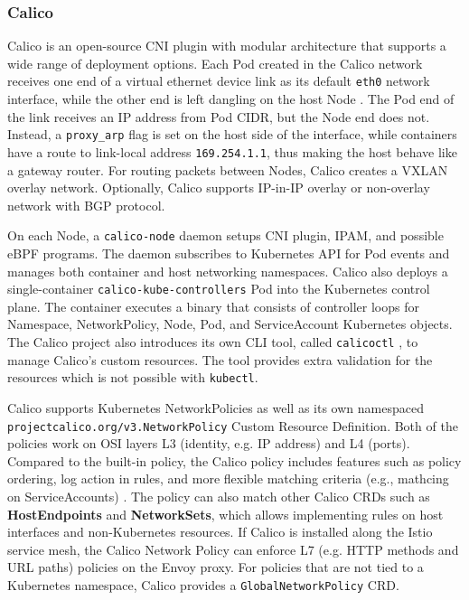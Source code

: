\documentclass[english, 12pt, a4paper, sci, utf8, a-2b, online]{aaltothesis}
\begin{document}
\subsubsection{Calico}

Calico \cite{calico} is an open-source CNI plugin with modular architecture that supports a wide range of deployment options. Each Pod created in the Calico network receives one end of a virtual ethernet device link as its default \texttt{eth0} network interface, while the other end is left dangling on the host Node \cite{calico-tkng}. The Pod end of the link receives an IP address from Pod CIDR, but the Node end does not. Instead, a \texttt{proxy\_arp} flag is set on the host side of the interface, while containers have a route to link-local address \texttt{169.254.1.1}, thus making the host behave like a gateway router. For routing packets between Nodes, Calico creates a VXLAN overlay network. Optionally, Calico supports IP-in-IP overlay or non-overlay network with BGP protocol.

On each Node, a \texttt{calico-node} daemon setups CNI plugin, IPAM, and possible eBPF programs. The daemon subscribes to Kubernetes API for Pod events and manages both container and host networking namespaces. Calico also deploys a single-container \texttt{calico-kube-controllers} Pod into the Kubernetes control plane. The container executes a binary that consists of controller loops for Namespace, NetworkPolicy, Node, Pod, and ServiceAccount Kubernetes objects. The Calico project also introduces its own CLI tool, called \texttt{calicoctl} \cite{calicoctl}, to manage Calico's custom resources. The tool provides extra validation for the resources which is not possible with \texttt{kubectl}.

Calico supports Kubernetes NetworkPolicies as well as its own namespaced \\\texttt{projectcalico.org/v3.NetworkPolicy} Custom Resource Definition. Both of the policies work on OSI layers L3 (identity, e.g. IP address) and L4 (ports). Compared to the built-in policy, the Calico policy includes features such as policy ordering, log action in rules, and more flexible matching criteria (e.g., mathcing on ServiceAccounts) \cite{calico-network-policy}. The policy can also match other Calico CRDs such as \textbf{HostEndpoints} and \textbf{NetworkSets}, which allows implementing rules on host interfaces and non-Kubernetes resources. If Calico is installed along the Istio service mesh, the Calico Network Policy can enforce L7 (e.g. HTTP methods and URL paths) policies on the Envoy proxy. For policies that are not tied to a Kubernetes namespace, Calico provides a \texttt{GlobalNetworkPolicy} CRD.
\end{document}
